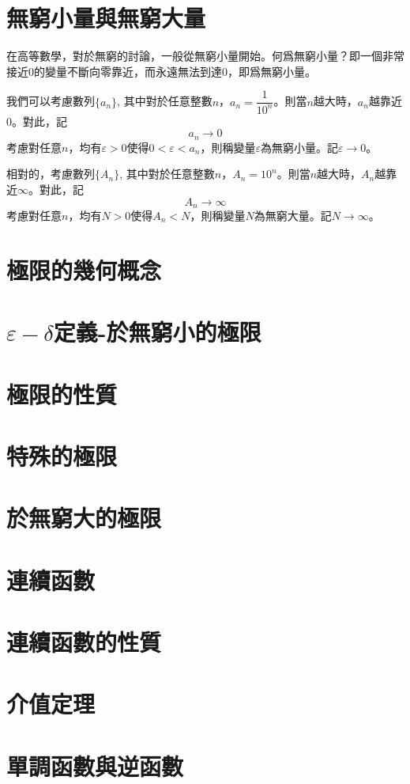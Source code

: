 \documentclass[12pt]{article}
\begin{document}
    \section*{無窮小量與無窮大量}
    
    在高等數學，對於無窮的討論，一般從無窮小量開始。何爲無窮小量？即一個非常接近0的變量不斷向零靠近，而永遠無法到達0，即爲無窮小量。

    我們可以考慮數列$\{a_n\}$, 其中對於任意整數$n$，$a_n=\dfrac{1}{10^n}$。則當$n$越大時，$a_n$越靠近0。對此，記$$a_n\to 0$$考慮對任意$n$，均有$\varepsilon>0$使得$0<\varepsilon<a_n$，則稱變量$\varepsilon$為無窮小量。記$\varepsilon\to 0$。

    相對的，考慮數列$\{A_n\}$, 其中對於任意整數$n$，$A_n=10^n$。則當$n$越大時，$A_n$越靠近$\infty$。對此，記$$A_n\to \infty$$考慮對任意$n$，均有$N>0$使得$A_n<N$，則稱變量$N$為無窮大量。記$N\to \infty$。
    \section*{極限的幾何概念}
    \section*{$\varepsilon-\delta$定義-於無窮小的極限}
    \section*{極限的性質}
    \section*{特殊的極限}
    \section*{於無窮大的極限}
    \section*{連續函數}
    \section*{連續函數的性質}
    \section*{介值定理}
    \section*{單調函數與逆函數}
\end{document}
